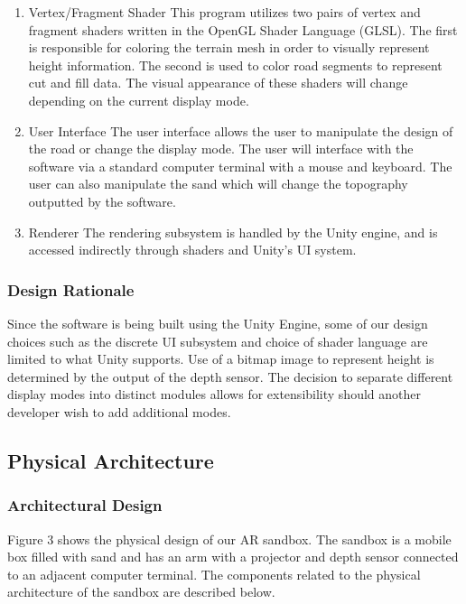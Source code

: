 \begin{enumerate}
\item{Vertex/Fragment Shader} %
This program utilizes two pairs of vertex and fragment shaders written in the OpenGL Shader Language (GLSL). 
The first is responsible for coloring the terrain mesh in order to visually represent height information. 
The second is used to color road segments to represent cut and fill data. 
The visual appearance of these shaders will change depending on the current display mode.

\item{User Interface} %
The user interface allows the user to manipulate the design of the road or change the display mode.
The user will interface with the software via a standard computer terminal with a mouse and keyboard.
The user can also manipulate the sand which will change the topography outputted by the software.

\item{Renderer}  %
The rendering subsystem is handled by the Unity engine, and is accessed indirectly through shaders and Unity's UI system.
\end{enumerate}

\subsubsection{Design Rationale}
Since the software is being built using the Unity Engine, some of our design choices such as the discrete UI subsystem and choice of shader language are limited to what Unity supports. Use of a bitmap image to represent height is determined by the output of the depth sensor. 
The decision to separate different display modes into distinct modules allows for extensibility should another developer wish to add additional modes.

\subsection{Physical Architecture} %


\subsubsection{Architectural Design}
Figure 3 shows the physical design of our AR sandbox.
The sandbox is a mobile box filled with sand and has an arm with a projector and depth sensor connected to an adjacent computer terminal. The components related to the physical architecture of the sandbox are described below.

